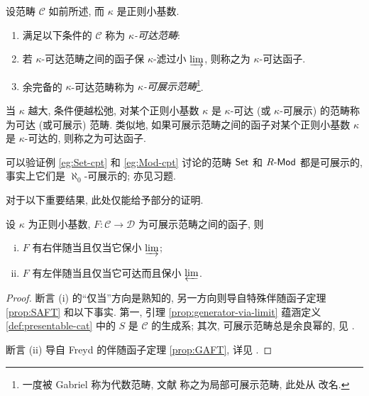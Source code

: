 \begin{definition}\label{def:presentable-cat}
	设范畴 $\mathcal{C}$ 如前所述, 而 $\kappa$ 是正则小基数.
	\begin{enumerate}
		\item 满足以下条件的 $\mathcal{C}$ 称为 \emph{$\kappa$-可达范畴}:
		\item 若 $\kappa$-可达范畴之间的函子保 $\kappa$-滤过小 $\varinjlim$, 则称之为 $\kappa$-可达函子.
		\item 余完备的 $\kappa$-可达范畴称为 \emph{$\kappa$-可展示范畴}\footnote{一度被 Gabriel 称为代数范畴, 文献 \cite{AR94, GU71} 称之为局部可展示范畴, 此处从 \cite[A.1.1]{Lu09} 改名.}.
	\end{enumerate}

	当 $\kappa$ 越大, 条件便越松弛, 对某个正则小基数 $\kappa$ 是 $\kappa$-可达 (或 $\kappa$-可展示) 的范畴称为可达 (或可展示) 范畴. 类似地, 如果可展示范畴之间的函子对某个正则小基数 $\kappa$ 是 $\kappa$-可达的, 则称之为可达函子.
\end{definition}

可以验证例 \ref{eg:Set-cpt} 和 \ref{eg:Mod-cpt} 讨论的范畴 $\mathsf{Set}$ 和 $R\text{-}\mathsf{Mod}$ 都是可展示的, 事实上它们是 $\aleph_0$-可展示的; 亦见习题.

对于以下重要结果, 此处仅能给予部分的证明.

\begin{theorem}
	设 $\kappa$ 为正则小基数, $F: \mathcal{C} \to \mathcal{D}$ 为可展示范畴之间的函子, 则
	\begin{enumerate}[(i)]
		\item $F$ 有右伴随当且仅当它保小 $\varinjlim$;
		\item $F$ 有左伴随当且仅当它可达而且保小 $\varprojlim$.
	\end{enumerate}
\end{theorem}
\begin{proof}
	断言 (i) 的``仅当''方向是熟知的, 另一方向则导自特殊伴随函子定理 \ref{prop:SAFT} 和以下事实. 第一, 引理 \ref{prop:generator-via-limit} 蕴涵定义 \ref{def:presentable-cat} 中的 $S$ 是 $\mathcal{C}$ 的生成系; 其次, 可展示范畴总是余良幂的, 见 \cite[1.58 Theorem]{AR94}.
	
	断言 (ii) 导自 Freyd 的伴随函子定理 \ref{prop:GAFT}, 详见 \cite[1.66 Theorem]{AR94}.
\end{proof}


